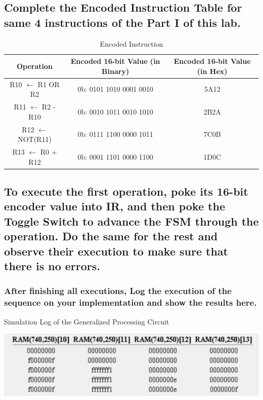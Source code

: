 \documentclass{article}
\begin{document}
		\subsection{Complete the Encoded Instruction Table for same 4 instructions of the Part I of this lab.}
		\begin{table}[!h]
			\centering
			\caption{Encoded Instruction}
			\vspace{0.2cm}		 
			\begin{tabular}{|c|c|c|}
				\hline
				Operation & Encoded 16-bit Value (in Binary) & Encoded 16-bit Value (in Hex)\\
				\hline\hline
				R10 $\leftarrow$ R1 OR R2 & 0b: 0101 1010 0001 0010 & 5A12\\
				\hline
				R11 $\leftarrow$ R2 - R10 & 0b: 0010 1011 0010 1010 & 2B2A\\
				\hline
				R12 $\leftarrow$ NOT(R11) & 0b: 0111 1100 0000 1011 & 7C0B\\
				\hline
				R13 $\leftarrow$ R0 + R12 & 0b: 0001 1101 0000 1100 & 1D0C\\
				\hline
			\end{tabular}
		\end{table}
	
		\subsection{To execute the first operation, poke its 16-bit encoder value into IR, and then poke the Toggle Switch to advance the FSM through the operation. Do the same for the rest and observe their execution to make sure that there is no errors.}
		
		\subsubsection{After finishing all executions, Log the execution of the sequence on your implementation and show the results here.}
		\begin{table}[!ht]
			\centering
			\caption{Simulation Log of the Generalized Processing Circuit}
			\vspace{0.2cm}
			\includegraphics[width=0.8\linewidth]{log_sim_table_part2.png}			
		\end{table}
		
\end{document}
